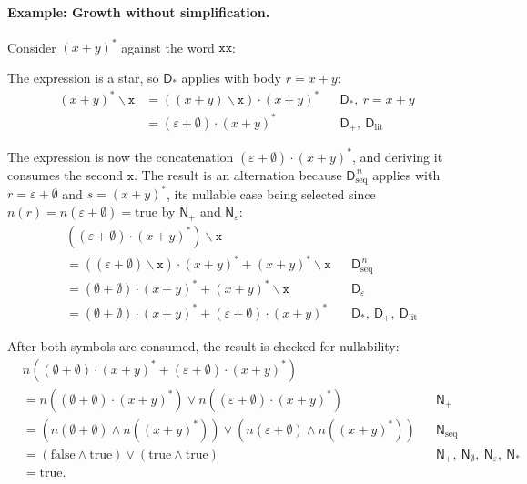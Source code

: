 %

\paragraph{Example: Growth without simplification.}
Consider $(x+y)^{*}$ against the word $\mathtt{xx}$:

The expression is a star, so $\mathsf{D}_{*}$ applies with
body $r = x+y$:
\begin{equation}\label{eq:der-3}
\begin{aligned}
(x+y)^{*} \backslash \mathtt{x}
  &= ((x+y) \backslash \mathtt{x}) \cdot (x+y)^{*}
  &&\mathsf{D}_{*},\ r = x+y \\
  &= (\varepsilon + \emptyset) \cdot (x+y)^{*}
  &&\mathsf{D}_{+},\ \mathsf{D}_{\mathrm{lit}}
\end{aligned}
\end{equation}

The expression is now the concatenation
$(\varepsilon + \emptyset) \cdot (x+y)^{*}$, and deriving it consumes the second
$\mathtt{x}$. The result is an alternation because
$\mathsf{D}_{\mathrm{seq}}^{\,n}$ applies with $r = \varepsilon + \emptyset$ and
$s = (x+y)^{*}$, its nullable case being selected since
$n(r) = n(\varepsilon + \emptyset) = \mathrm{true}$ by $\mathsf{N}_{+}$ and $\mathsf{N}_{\varepsilon}$:
\begin{equation}\label{eq:der-4}
\begin{aligned}
&((\varepsilon + \emptyset) \cdot (x+y)^{*}) \backslash \mathtt{x} \\
  &= ((\varepsilon + \emptyset) \backslash \mathtt{x}) \cdot (x+y)^{*}
     + (x+y)^{*} \backslash \mathtt{x}
  &&\mathsf{D}_{\mathrm{seq}}^{\,n} \\
  &= (\emptyset + \emptyset) \cdot (x+y)^{*}
     + (x+y)^{*} \backslash \mathtt{x}
  &&\mathsf{D}_{\varepsilon} \\
  &= (\emptyset + \emptyset) \cdot (x+y)^{*}
     + (\varepsilon + \emptyset) \cdot (x+y)^{*}
  &&\mathsf{D}_{*},\ \mathsf{D}_{+},\ \mathsf{D}_{\mathrm{lit}}
\end{aligned}
\end{equation}

After both symbols are consumed, the result is checked for nullability:
\begin{equation}\label{eq:der-5}
\begin{aligned}
&n((\emptyset + \emptyset) \cdot (x+y)^{*} + (\varepsilon + \emptyset) \cdot (x+y)^{*}) \\
&= n((\emptyset + \emptyset) \cdot (x+y)^{*}) \lor n((\varepsilon + \emptyset) \cdot (x+y)^{*})
   &&\mathsf{N}_{+} \\
&= (n(\emptyset + \emptyset) \land n((x+y)^{*})) \lor
   (n(\varepsilon + \emptyset) \land n((x+y)^{*}))
   &&\mathsf{N}_{\mathrm{seq}} \\
&= (\mathrm{false} \land \mathrm{true}) \lor
   (\mathrm{true} \land \mathrm{true})
   &&\mathsf{N}_{+},\ \mathsf{N}_{\emptyset},\ \mathsf{N}_{\varepsilon},\ \mathsf{N}_{*} \\
&= \mathrm{true}.
\end{aligned}
\end{equation}

